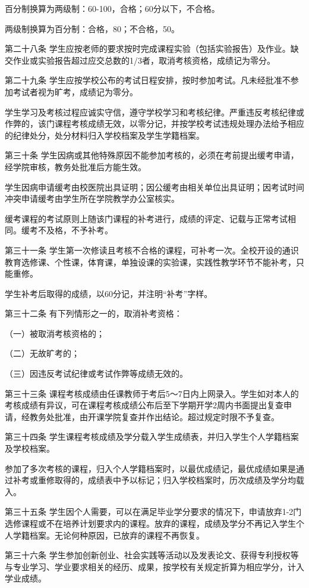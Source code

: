 \documentclass[UTF8,12pt,a4paper]{report}
\begin{document}
百分制换算为两级制：60-100，合格；60分以下，不合格。

两级制换算为百分制：合格，80；不合格，50。

第二十八条  学生应按老师的要求按时完成课程实验（包括实验报告）及作业。缺交作业或实验报告超过应交总数的1/3者，取消考核资格，成绩记为零分。

第二十九条  学生应按学校公布的考试日程安排，按时参加考试。凡未经批准不参加考试者视为旷考，成绩记为零分。

学生学习及考核过程应诚实守信，遵守学校学习和考核纪律。严重违反考核纪律或作弊的，该门课程考核成绩无效，以零分记，并按学校考试违规处理办法给予相应的纪律处分，处分材料归入学校档案及学生学籍档案。

第三十条  学生因病或其他特殊原因不能参加考核的，必须在考前提出缓考申请，经学院审核，教务处批准后方能生效。

学生因病申请缓考由校医院出具证明；因公缓考由相关单位出具证明；因考试时间冲突申请缓考由学生所在学院教学办公室核实。

缓考课程的考试原则上随该门课程的补考进行，成绩的评定、记载与正常考试相同。缓考不及格，不予补考。

第三十一条  学生第一次修读且考核不合格的课程，可补考一次。全校开设的通识教育选修课、个性课，体育课，单独设课的实验课，实践性教学环节不能补考，只能重修。

学生补考后取得的成绩，以60分记，并注明“补考”字样。

第三十二条  有下列情形之一的，取消补考资格：

（一）被取消考核资格的；

（二）无故旷考的；

（三）因违反考试纪律或考试作弊等成绩无效的。

第三十三条  课程考核成绩由任课教师于考后5～7日内上网录入。学生如对本人的考核成绩有异议，可在课程考核成绩公布后至下学期开学2周内书面提出复查申请，经教务处批准，由开课学院复查并作出结论。超过规定时限不予复查。

第三十四条  学生课程考核成绩及学分载入学生成绩表，并归入学生个人学籍档案及学校档案。

参加了多次考核的课程，归入个人学籍档案时，以最优成绩记，最优成绩如果是通过补考或重修取得的，成绩表中予以标记；归入学校档案时，历次成绩及学分均载入。

第三十五条  学生因个人需要，可以在满足毕业学分要求的情况下，申请放弃1-2门选修课程或不在培养计划要求内的课程。放弃的课程，成绩及学分不再记入学生个人学籍档案。无论何种原因，已放弃的课程不再恢复。

第三十六条  学生参加创新创业、社会实践等活动以及发表论文、获得专利授权等与专业学习、学业要求相关的经历、成果，按学校有关规定折算为相应学分，计入学业成绩。
\end{document}
